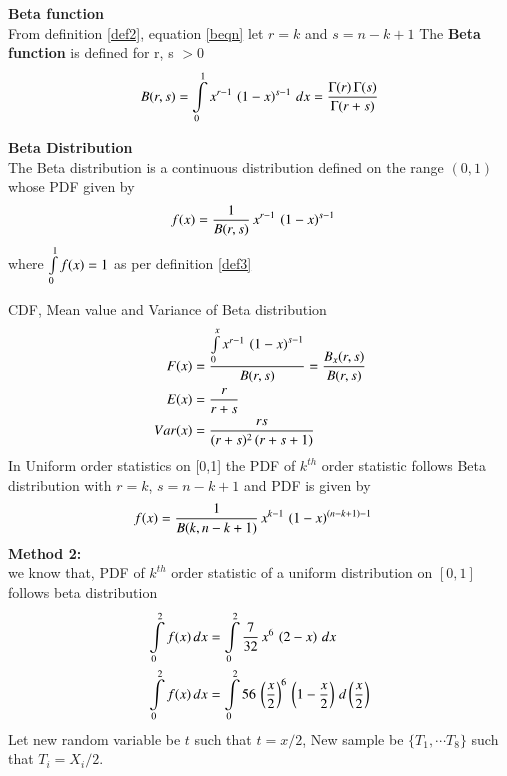\documentclass[journal,12pt,twocolumn]{IEEEtran}
\begin{document}
\begin{definition}
\textbf{Beta function}\\
From definition \eqref{def2}, equation \eqref{beqn} let $r = k$ and $s = n-k+1$ The \textbf{Beta function} is
defined for r, s $> 0$
\begin{equation}
B(r,s) = \int\limits_{0}^{1} x^{r-1}\,\left(1-x\right)^{s-1}\,dx = \dfrac{\Gamma(r)\,\Gamma(s)}{\Gamma(r+s)} 
\label{eqn_5}
\end{equation}
\newpage
\end{definition}
\textbf{Beta Distribution} \\
The Beta distribution is a continuous distribution defined on the range $(0,1)$ whose PDF given by 
\begin{align}
f(x) &= \dfrac{1}{B(r,s)}\,x^{r-1}\,\left(1-x\right)^{s-1} 
\end{align}
where $\int\limits_{0}^1f(x) = 1$ as per definition \eqref{def3} 

CDF, Mean value and Variance of Beta distribution
\begin{align}
 F(x)   &=\dfrac{\int\limits_{0}^{x}x^{r-1}\,\left(1-x\right)^{s-1}}{B(r,s)} =    \dfrac{B_{x}(r,s)}{B(r,s)} \\
 E(x)   &=   \dfrac{r}{r+s} \\
 Var(x) &= \dfrac{rs}{(r+s)^{2}\,(r+s+1)}
\end{align}
In Uniform order statistics on [0,1] the PDF of $k^{th}$ order statistic follows Beta distribution with $r=k$, $s=n-k+1$ and PDF is given by 
\begin{align}
f(x) &= \dfrac{1}{B(k,n-k+1)}\,x^{k-1}\,\left(1-x\right)^{(n-k+1)-1} 
\end{align}
\textbf{Method 2:}\\
we know that, PDF of $k^{th}$ order statistic of a uniform distribution on $[0,1]$ follows 
beta distribution
\begin{align}
\int\limits_{0}^{2}f(x)\,dx &= \int\limits_{0}^{2} \dfrac{7}{32}\,x^{6}\,\left(2-x\right)\,dx \\
\int\limits_{0}^{2}f(x)\,dx &= \int\limits_{0}^{2} 56\,\left(\dfrac{x}{2}\right)^{6}\,\left(1-\dfrac{x}{2}\right)\,d\left(\dfrac{x}{2}\right)
\end{align}
Let new random variable be $t$ such that $t=x/2$, New sample be $\{T_1,\cdots T_8\}$ such that $T_{i}=X_{i}/2$.
\end{document}
